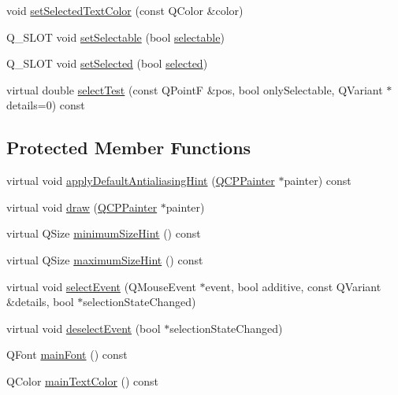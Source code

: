 \begin{DoxyCompactItemize}
\item 
void \hyperlink{class_q_c_p_plot_title_a09ffd8c52ac8824d00382f84be391b66}{set\+Selected\+Text\+Color} (const Q\+Color \&color)
\item 
Q\+\_\+\+S\+L\+O\+T void \hyperlink{class_q_c_p_plot_title_a8866b07b9fa14877d4cefbf38406c5dd}{set\+Selectable} (bool \hyperlink{class_q_c_p_plot_title_a8d75c7cbcf2049c9512a3335d6f11416}{selectable})
\item 
Q\+\_\+\+S\+L\+O\+T void \hyperlink{class_q_c_p_plot_title_a8d441a889d371307df86f1ab7687a333}{set\+Selected} (bool \hyperlink{class_q_c_p_plot_title_a9771f3a4bca026484d7c8b5d953b5e82}{selected})
\item 
virtual double \hyperlink{class_q_c_p_plot_title_a5b7ae716be9134a48f4e378feb0e6699}{select\+Test} (const Q\+Point\+F \&pos, bool only\+Selectable, Q\+Variant $\ast$details=0) const 
\end{DoxyCompactItemize}
\subsection*{Protected Member Functions}
\begin{DoxyCompactItemize}
\item 
virtual void \hyperlink{class_q_c_p_plot_title_a0e2a491864bf8d8e8b159ef38e9d85bd}{apply\+Default\+Antialiasing\+Hint} (\hyperlink{class_q_c_p_painter}{Q\+C\+P\+Painter} $\ast$painter) const 
\item 
virtual void \hyperlink{class_q_c_p_plot_title_ae4f1f8d24489628dabb7256363b097d2}{draw} (\hyperlink{class_q_c_p_painter}{Q\+C\+P\+Painter} $\ast$painter)
\item 
virtual Q\+Size \hyperlink{class_q_c_p_plot_title_a695e6037e72a1e129387e7e4a980faea}{minimum\+Size\+Hint} () const 
\item 
virtual Q\+Size \hyperlink{class_q_c_p_plot_title_a2afaf11a379038e5ca58040a0eb0ae4c}{maximum\+Size\+Hint} () const 
\item 
virtual void \hyperlink{class_q_c_p_plot_title_a22672ef2abe442b1e73b7ee04cff9bdd}{select\+Event} (Q\+Mouse\+Event $\ast$event, bool additive, const Q\+Variant \&details, bool $\ast$selection\+State\+Changed)
\item 
virtual void \hyperlink{class_q_c_p_plot_title_ac6dfce05bebdb9bd0bfacd5ff02f3325}{deselect\+Event} (bool $\ast$selection\+State\+Changed)
\item 
Q\+Font \hyperlink{class_q_c_p_plot_title_a7e74004e3a68118b16491848708a8b3a}{main\+Font} () const 
\item 
Q\+Color \hyperlink{class_q_c_p_plot_title_ac1b02546563a2e76f97d78a576f82f5a}{main\+Text\+Color} () const 
\end{DoxyCompactItemize}
